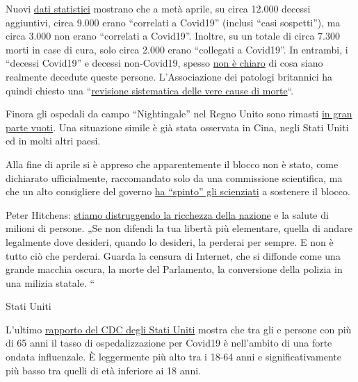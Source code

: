 Nuovi
\href{https://www.telegraph.co.uk/politics/2020/05/01/evidence-rising-britains-lockdown-could-deadly-mistake/}{dati
statistici} mostrano che a metà aprile, su circa 12.000 decessi
aggiuntivi, circa 9.000 erano ``correlati a Covid19'' (inclusi ``casi
sospetti''), ma circa 3.000 non erano ``correlati a Covid19''. Inoltre,
su un totale di circa 7.300 morti in case di cura, solo circa 2.000
erano ``collegati a Covid19''. In entrambi, i ``decessi Covid19'' e
decessi non-Covid19, spesso
\href{https://www.hsj.co.uk/commissioning/thousands-of-extra-deaths-outside-hospital-not-attributed-to-covid-19/7027459.article}{non
è chiaro} di cosa siano realmente decedute queste persone.
L'Associazione dei patologi britannici ha quindi chiesto una
``\href{https://www.hsj.co.uk/coronavirus/systematic-reviews-to-discover-true-cause-of-outbreak-deaths/7027491.article}{revisione
sistematica delle vere cause di morte}``.

Finora gli ospedali da campo ``Nightingale'' nel Regno Unito sono
rimasti
\href{https://www.telegraph.co.uk/news/0/do-many-nhs-nightingale-hospitals-remain-empty/}{in
gran parte vuoti}. Una situazione simile è già stata osservata in Cina,
negli Stati Uniti ed in molti altri paesi.

Alla fine di aprile si è appreso che apparentemente il blocco non è
stato, come dichiarato ufficialmente, raccomandato solo da una
commissione scientifica, ma che un alto consigliere del governo
\href{https://www.bloomberg.com/news/articles/2020-04-28/top-aide-to-u-k-s-johnson-pushed-scientists-to-back-lockdown}{ha
``spinto'' gli scienziati} a sostenere il blocco.

Peter Hitchens:
\href{https://hitchensblog.mailonsunday.co.uk/2020/05/peter-hitchens-were-destroying-the-nations-wealth-and-the-health-of-millions.html}{stiamo
distruggendo la ricchezza della nazione} e la salute di milioni di
persone. „Se non difendi la tua libertà più elementare, quella di andare
legalmente dove desideri, quando lo desideri, la perderai per sempre. E
non è tutto ciò che perderai. Guarda la censura di Internet, che si
diffonde come una grande macchia oscura, la morte del Parlamento, la
conversione della polizia in una milizia statale. ``

Stati Uniti

L'ultimo
\href{https://www.cdc.gov/coronavirus/2019-ncov/covid-data/covidview/index.html}{rapporto
del CDC degli Stati Uniti} mostra che tra gli e persone con più di 65
anni il tasso di ospedalizzazione per Covid19 è nell'ambito di una forte
ondata influenzale. È leggermente più alto tra i 18-64 anni e
significativamente più basso tra quelli di età inferiore ai 18 anni.

